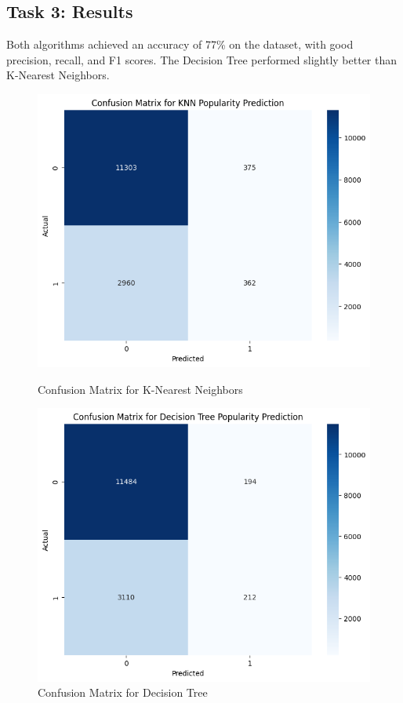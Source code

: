 \documentclass[a4paper,11pt]{article}
\begin{document}
\subsection{Task 3: Results}

Both algorithms achieved an accuracy of 77\% on the dataset, with good precision, recall, and F1 scores. The Decision Tree performed slightly better than K-Nearest Neighbors.

\begin{figure}[h!]
    \centering
    \begin{minipage}{0.45\textwidth}
        \centering
        \includegraphics[width=\textwidth]{knn.png}
        \caption{Confusion Matrix for K-Nearest Neighbors}
        \label{fig:knn}
    \end{minipage}
    \hfill
    \begin{minipage}{0.45\textwidth}
        \centering
        \includegraphics[width=\textwidth]{dt.png}
        \caption{Confusion Matrix for Decision Tree}
        \label{fig:dt}
    \end{minipage}
\end{figure}
\end{document}
